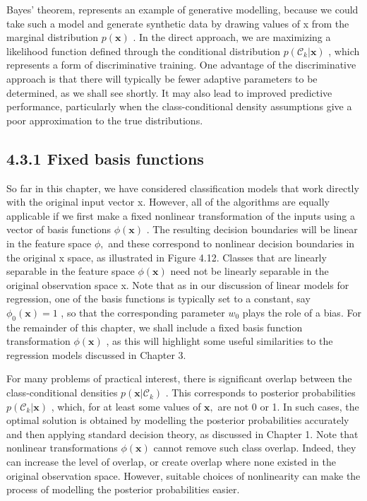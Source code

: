 \documentclass[
  10
]{article}
\begin{document}
Bayes' theorem, represents an example of generative modelling, because
we could take such a model and generate synthetic data by drawing values
of x from the marginal distribution \(p ( \mathbf { x } )\) . In the
direct approach, we are maximizing a likelihood function defined through
the conditional distribution
\(p ( \mathcal { C } _ { k } \vert \mathbf { x } )\) , which represents
a form of discriminative training. One advantage of the discriminative
approach is that there will typically be fewer adaptive parameters to be
determined, as we shall see shortly. It may also lead to improved
predictive performance, particularly when the class-conditional density
assumptions give a poor approximation to the true distributions.

\subsection{4.3.1 Fixed basis functions}\label{fixed-basis-functions}

So far in this chapter, we have considered classification models that
work directly with the original input vector x. However, all of the
algorithms are equally applicable if we first make a fixed nonlinear
transformation of the inputs using a vector of basis functions
\(\phi ( \mathbf { x } )\) . The resulting decision boundaries will be
linear in the feature space \(\phi ,\) and these correspond to nonlinear
decision boundaries in the original x space, as illustrated in Figure
4.12. Classes that are linearly separable in the feature space
\(\phi ( \mathbf { x } )\) need not be linearly separable in the
original observation space x. Note that as in our discussion of linear
models for regression, one of the basis functions is typically set to a
constant, say \(\phi _ { 0 } ( \mathbf { x } ) = 1\) , so that the
corresponding parameter \(w _ { 0 }\) plays the role of a bias. For the
remainder of this chapter, we shall include a fixed basis function
transformation \(\phi ( \mathbf { x } )\) , as this will highlight some
useful similarities to the regression models discussed in Chapter 3.

For many problems of practical interest, there is significant overlap
between the class-conditional densities
\(p ( \mathbf { x } | \mathcal { C } _ { k } )\) . This corresponds to
posterior probabilities
\(p ( \mathcal { C } _ { k } \vert \mathbf { x } )\) , which, for at
least some values of \(\mathbf { x } ,\) are not 0 or 1. In such cases,
the optimal solution is obtained by modelling the posterior
probabilities accurately and then applying standard decision theory, as
discussed in Chapter 1. Note that nonlinear transformations
\(\phi ( \mathbf { x } )\) cannot remove such class overlap. Indeed,
they can increase the level of overlap, or create overlap where none
existed in the original observation space. However, suitable choices of
nonlinearity can make the process of modelling the posterior
probabilities easier.
\end{document}
